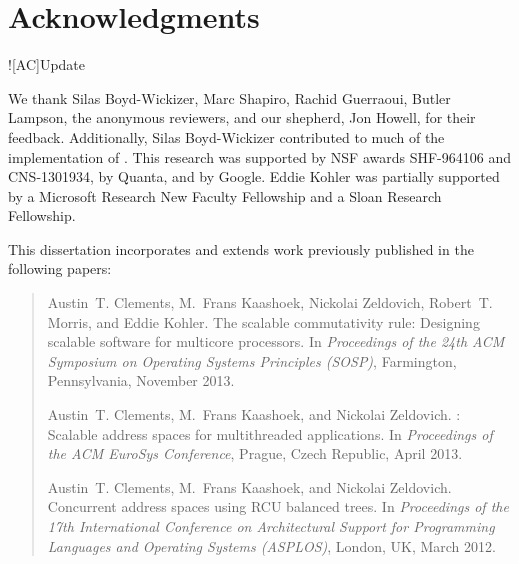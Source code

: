 \chapter*{Acknowledgments}

\XXX![AC]{Update}

We thank Silas Boyd-Wickizer, Marc Shapiro, Rachid Guerraoui,
Butler Lampson, the anonymous reviewers, and our
shepherd, Jon Howell, for their feedback.
%
Additionally, Silas Boyd-Wickizer contributed to much of the
implementation of \sys.
%
This research was supported by NSF awards SHF-964106 and CNS-1301934,
by Quanta, and by Google. Eddie Kohler was partially supported by a
Microsoft Research New Faculty Fellowship and a Sloan Research
Fellowship.



This dissertation incorporates and extends work previously published
in the following papers:

\begin{quote}
  Austin~T. Clements, M.~Frans Kaashoek, Nickolai Zeldovich,
  Robert~T. Morris, and Eddie Kohler.
  \newblock The scalable commutativity rule: Designing scalable
  software for multicore processors.
  \newblock In \emph{Proceedings of the 24th ACM Symposium on
    Operating Systems Principles (\mbox{SOSP})}, Farmington,
  Pennsylvania, November 2013.

  Austin~T. Clements, M.~Frans Kaashoek, and Nickolai Zeldovich.
  : Scalable address spaces for multithreaded
  applications.
  \newblock In \emph{Proceedings of the ACM EuroSys Conference},
  Prague, Czech Republic, April 2013.

  Austin~T. Clements, M.~Frans Kaashoek, and Nickolai Zeldovich.
  \newblock Concurrent address spaces using {RCU} balanced trees.
  \newblock In \emph{Proceedings of the 17th International Conference
    on Architectural Support for Programming Languages and Operating
    Systems (\mbox{ASPLOS})}, London, UK, March 2012.
\end{quote}
